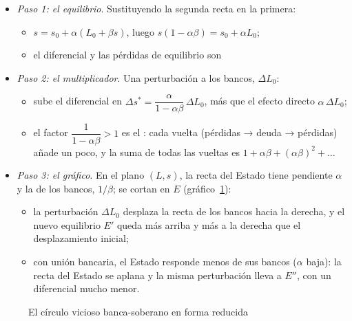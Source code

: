\documentclass[11pt]{article}
\begin{document}
\begin{itemize}
\item \emph{Paso 1: el equilibrio}. Sustituyendo la segunda recta en la primera:
  \begin{itemize}
  \item $s=s_0+\alpha(L_0+\beta s)$, luego $s(1-\alpha\beta)=s_0+\alpha L_0$;
  \item el diferencial y las pérdidas de equilibrio son
  \end{itemize}
\item \emph{Paso 2: el multiplicador}. Una perturbación a los bancos, $\Delta L_0$:
  \begin{itemize}
  \item sube el diferencial en $\Delta s^*=\dfrac{\alpha}{1-\alpha\beta}\,\Delta L_0$, más que el efecto directo $\alpha\,\Delta L_0$;
  \item el factor $\dfrac{1}{1-\alpha\beta}>1$ es el : cada vuelta (pérdidas → deuda → pérdidas) añade un poco, y la suma de todas las vueltas es $1+\alpha\beta+(\alpha\beta)^2+\dots$
  \end{itemize}
\item \emph{Paso 3: el gráfico}. En el plano $(L,s)$, la recta del Estado tiene pendiente $\alpha$ y la de los bancos, $1/\beta$; se cortan en $E$ (gráfico~\ref{fig:bucle}):
  \begin{itemize}
  \item la perturbación $\Delta L_0$ desplaza la recta de los bancos hacia la derecha, y el nuevo equilibrio $E'$ queda más arriba y más a la derecha que el desplazamiento inicial;
  \item con unión bancaria, el Estado responde menos de sus bancos ($\alpha$ baja): la recta del Estado se aplana y la misma perturbación lleva a $E''$, con un diferencial mucho menor.
  \end{itemize}
\end{itemize}

\begin{figure}[H]
\centering
\caption{El círculo vicioso banca-soberano en forma reducida}\label{fig:bucle}
\end{figure}
\end{document}
